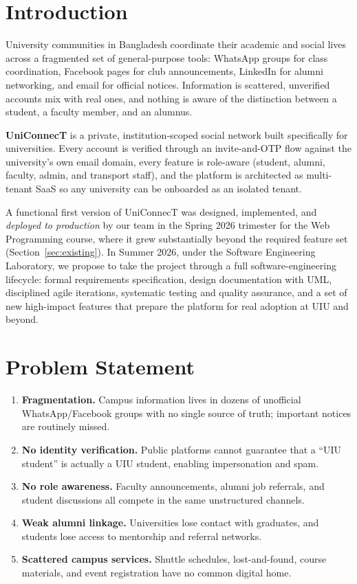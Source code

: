 \documentclass[11pt, a4paper]{article}
\begin{document}
\section{Introduction}

University communities in Bangladesh coordinate their academic and social
lives across a fragmented set of general-purpose tools: WhatsApp groups for
class coordination, Facebook pages for club announcements, LinkedIn for
alumni networking, and email for official notices. Information is scattered,
unverified accounts mix with real ones, and nothing is aware of the
distinction between a student, a faculty member, and an alumnus.

\textbf{UniConnecT} is a private, institution-scoped social network built
specifically for universities. Every account is verified through an
invite-and-OTP flow against the university's own email domain, every feature
is role-aware (student, alumni, faculty, admin, and transport staff), and the
platform is architected as multi-tenant SaaS so any university can be
onboarded as an isolated tenant.

A functional first version of UniConnecT was designed, implemented, and
\emph{deployed to production} by our team in the Spring 2026 trimester for
the Web Programming course, where it grew substantially beyond the required
feature set (Section~\ref{sec:existing}). In Summer 2026, under the Software
Engineering Laboratory, we propose to take the project through a full
software-engineering lifecycle: formal requirements specification, design
documentation with UML, disciplined agile iterations, systematic testing and
quality assurance, and a set of new high-impact features that prepare the
platform for real adoption at UIU and beyond.

\section{Problem Statement}

\begin{enumerate}[leftmargin=1.5em, itemsep=2pt]
    \item \textbf{Fragmentation.} Campus information lives in dozens of
    unofficial WhatsApp/Facebook groups with no single source of truth;
    important notices are routinely missed.
    \item \textbf{No identity verification.} Public platforms cannot
    guarantee that a ``UIU student'' is actually a UIU student, enabling
    impersonation and spam.
    \item \textbf{No role awareness.} Faculty announcements, alumni job
    referrals, and student discussions all compete in the same unstructured
    channels.
    \item \textbf{Weak alumni linkage.} Universities lose contact with
    graduates, and students lose access to mentorship and referral networks.
    \item \textbf{Scattered campus services.} Shuttle schedules, lost-and-found,
    course materials, and event registration have no common digital home.
\end{enumerate}
\end{document}
